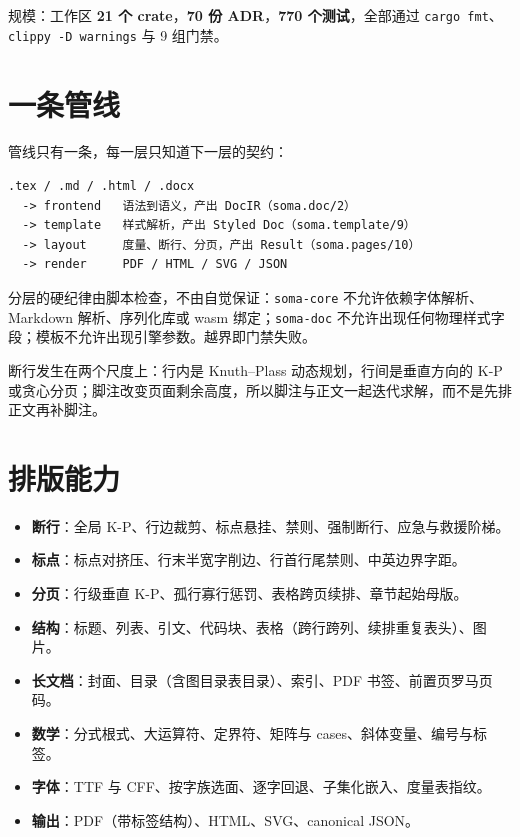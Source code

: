 \documentclass{article}
\begin{document}
规模：工作区 \textbf{21 个 crate}，\textbf{70 份 ADR}，\textbf{770 个测试}，全部通过 \texttt{cargo fmt}、\texttt{clippy -D warnings} 与 9 组门禁。

\section{一条管线}

管线只有一条，每一层只知道下一层的契约：

\begin{verbatim}
.tex / .md / .html / .docx
  -> frontend   语法到语义，产出 DocIR（soma.doc/2）
  -> template   样式解析，产出 Styled Doc（soma.template/9）
  -> layout     度量、断行、分页，产出 Result（soma.pages/10）
  -> render     PDF / HTML / SVG / JSON
\end{verbatim}

分层的硬纪律由脚本检查，不由自觉保证：\texttt{soma-core} 不允许依赖字体解析、Markdown 解析、序列化库或 wasm 绑定；\texttt{soma-doc} 不允许出现任何物理样式字段；模板不允许出现引擎参数。越界即门禁失败。

断行发生在两个尺度上：行内是 Knuth--Plass 动态规划，行间是垂直方向的 K-P 或贪心分页；脚注改变页面剩余高度，所以脚注与正文一起迭代求解，而不是先排正文再补脚注。

\section{排版能力}

\begin{itemize}
\item \textbf{断行}：全局 K-P、行边裁剪、标点悬挂、禁则、强制断行、应急与救援阶梯。
\item \textbf{标点}：标点对挤压、行末半宽字削边、行首行尾禁则、中英边界字距。
\item \textbf{分页}：行级垂直 K-P、孤行寡行惩罚、表格跨页续排、章节起始母版。
\item \textbf{结构}：标题、列表、引文、代码块、表格（跨行跨列、续排重复表头）、图片。
\item \textbf{长文档}：封面、目录（含图目录表目录）、索引、PDF 书签、前置页罗马页码。
\item \textbf{数学}：分式根式、大运算符、定界符、矩阵与 cases、斜体变量、编号与标签。
\item \textbf{字体}：TTF 与 CFF、按字族选面、逐字回退、子集化嵌入、度量表指纹。
\item \textbf{输出}：PDF（带标签结构）、HTML、SVG、canonical JSON。
\end{itemize}
\end{document}
